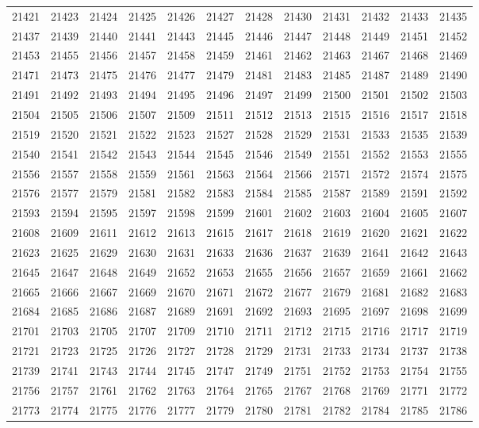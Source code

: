 \begin{center}
\begin{longtable}{llllllllllll}
21421 &21423 &21424 &21425 &21426 &21427 &21428 &21430 &21431 &21432 &21433 &21435 \\
21437 &21439 &21440 &21441 &21443 &21445 &21446 &21447 &21448 &21449 &21451 &21452 \\
21453 &21455 &21456 &21457 &21458 &21459 &21461 &21462 &21463 &21467 &21468 &21469 \\
21471 &21473 &21475 &21476 &21477 &21479 &21481 &21483 &21485 &21487 &21489 &21490 \\
21491 &21492 &21493 &21494 &21495 &21496 &21497 &21499 &21500 &21501 &21502 &21503 \\
21504 &21505 &21506 &21507 &21509 &21511 &21512 &21513 &21515 &21516 &21517 &21518 \\
21519 &21520 &21521 &21522 &21523 &21527 &21528 &21529 &21531 &21533 &21535 &21539 \\
21540 &21541 &21542 &21543 &21544 &21545 &21546 &21549 &21551 &21552 &21553 &21555 \\
21556 &21557 &21558 &21559 &21561 &21563 &21564 &21566 &21571 &21572 &21574 &21575 \\
21576 &21577 &21579 &21581 &21582 &21583 &21584 &21585 &21587 &21589 &21591 &21592 \\
21593 &21594 &21595 &21597 &21598 &21599 &21601 &21602 &21603 &21604 &21605 &21607 \\
21608 &21609 &21611 &21612 &21613 &21615 &21617 &21618 &21619 &21620 &21621 &21622 \\
21623 &21625 &21629 &21630 &21631 &21633 &21636 &21637 &21639 &21641 &21642 &21643 \\
21645 &21647 &21648 &21649 &21652 &21653 &21655 &21656 &21657 &21659 &21661 &21662 \\
21665 &21666 &21667 &21669 &21670 &21671 &21672 &21677 &21679 &21681 &21682 &21683 \\
21684 &21685 &21686 &21687 &21689 &21691 &21692 &21693 &21695 &21697 &21698 &21699 \\
21701 &21703 &21705 &21707 &21709 &21710 &21711 &21712 &21715 &21716 &21717 &21719 \\
21721 &21723 &21725 &21726 &21727 &21728 &21729 &21731 &21733 &21734 &21737 &21738 \\
21739 &21741 &21743 &21744 &21745 &21747 &21749 &21751 &21752 &21753 &21754 &21755 \\
21756 &21757 &21761 &21762 &21763 &21764 &21765 &21767 &21768 &21769 &21771 &21772 \\
21773 &21774 &21775 &21776 &21777 &21779 &21780 &21781 &21782 &21784 &21785 &21786 \\

\end{longtable}
\end{center}

